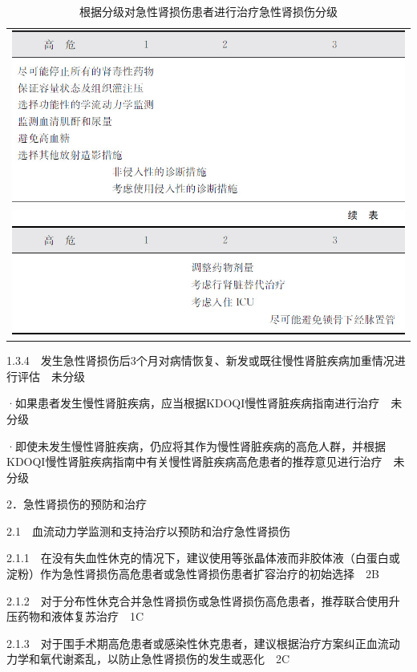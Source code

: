 \begin{longtable}{c}
  \caption{根据分级对急性肾损伤患者进行治疗急性肾损伤分级}
  \label{tabapp-16}
  \endfirsthead
  \caption[]{根据分级对急性肾损伤患者进行治疗急性肾损伤分级}
  \endhead
\includegraphics[width=\textwidth,height=\textheight,keepaspectratio]{./images/Image00320.jpg}\\
\includegraphics[width=\textwidth,height=\textheight,keepaspectratio]{./images/Image00321.jpg}
\end{longtable}

1.3.4　发生急性肾损伤后3个月对病情恢复、新发或既往慢性肾脏疾病加重情况进行评估　未分级

·如果患者发生慢性肾脏疾病，应当根据KDOQI慢性肾脏疾病指南进行治疗　未分级

·即使未发生慢性肾脏疾病，仍应将其作为慢性肾脏疾病的高危人群，并根据KDOQI慢性肾脏疾病指南中有关慢性肾脏疾病高危患者的推荐意见进行治疗　未分级

2．急性肾损伤的预防和治疗

2.1　血流动力学监测和支持治疗以预防和治疗急性肾损伤

2.1.1　在没有失血性休克的情况下，建议使用等张晶体液而非胶体液（白蛋白或淀粉）作为急性肾损伤高危患者或急性肾损伤患者扩容治疗的初始选择　2B

2.1.2　对于分布性休克合并急性肾损伤或急性肾损伤高危患者，推荐联合使用升压药物和液体复苏治疗　1C

2.1.3　对于围手术期高危患者或感染性休克患者，建议根据治疗方案纠正血流动力学和氧代谢紊乱，以防止急性肾损伤的发生或恶化　2C

